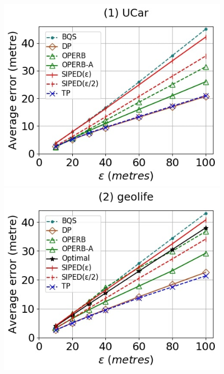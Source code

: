 \begin{figure}[tb!]
	\centering
	\includegraphics[scale=0.250]{Figures/Exp-PED-error-epsilon-service.jpg}	\hspace{0.5ex}
	\includegraphics[scale=0.250]{Figures/Exp-PED-error-epsilon-geolife.jpg}	\hspace{0.5ex}

\end{figure}
